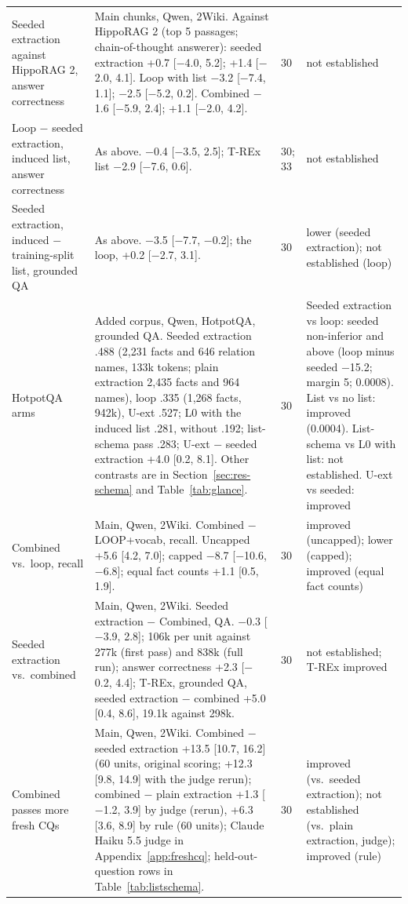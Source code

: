 \begin{table}[!t]
\begin{tabular}{P{3.5cm}P{9.4cm}P{0.8cm}P{3.9cm}}
Seeded extraction against HippoRAG 2, answer correctness & Main chunks, Qwen, 2Wiki. Against HippoRAG 2 (top 5 passages; chain-of-thought answerer): seeded extraction +0.7 [$-$4.0, 5.2]; +1.4 [$-$2.0, 4.1]. Loop with list $-$3.2 [$-$7.4, 1.1]; $-$2.5 [$-$5.2, 0.2]. Combined $-$1.6 [$-$5.9, 2.4]; +1.1 [$-$2.0, 4.2]. & 30 & not established \\
Loop $-$ seeded extraction, induced list, answer correctness & As above. $-$0.4 [$-$3.5, 2.5]; T-REx list $-$2.9 [$-$7.6, 0.6]. & 30; 33 & not established \\
Seeded extraction, induced $-$ training-split list, grounded QA & As above. $-$3.5 [$-$7.7, $-$0.2]; the loop, +0.2 [$-$2.7, 3.1]. & 30 & lower (seeded extraction); not established (loop) \\
HotpotQA arms & Added corpus, Qwen, HotpotQA, grounded QA. Seeded extraction .488 (2,231 facts and 646 relation names, 133k tokens; plain extraction 2,435 facts and 964 names), loop .335 (1,268 facts, 942k), U-ext .527; L0 with the induced list .281, without .192; list-schema pass .283; U-ext $-$ seeded extraction +4.0 [0.2, 8.1]. Other contrasts are in Section~\ref{sec:res-schema} and Table~\ref{tab:glance}. & 30 & Seeded extraction vs loop: seeded non-inferior and above (loop minus seeded $-$15.2; margin 5; 0.0008). List vs no list: improved (0.0004). List-schema vs L0 with list: not established. U-ext vs seeded: improved \\
Combined vs.\ loop, recall & Main, Qwen, 2Wiki. Combined $-$ LOOP+vocab, recall. Uncapped +5.6 [4.2, 7.0]; capped $-$8.7 [$-$10.6, $-$6.8]; equal fact counts +1.1 [0.5, 1.9]. & 30 & improved (uncapped); lower (capped); improved (equal fact counts) \\
Seeded extraction vs.\ combined & Main, Qwen, 2Wiki. Seeded extraction $-$ Combined, QA. $-$0.3 [$-$3.9, 2.8]; 106k per unit against 277k (first pass) and 838k (full run); answer correctness +2.3 [$-$0.2, 4.4]; T-REx, grounded QA, seeded extraction $-$ combined +5.0 [0.4, 8.6], 19.1k against 298k. & 30 & not established; T-REx improved \\
Combined passes more fresh CQs & Main, Qwen, 2Wiki. Combined $-$ seeded extraction +13.5 [10.7, 16.2] (60 units, original scoring; +12.3 [9.8, 14.9] with the judge rerun); combined $-$ plain extraction +1.3 [$-$1.2, 3.9] by judge (rerun), +6.3 [3.6, 8.9] by rule (60 units); Claude Haiku 5.5 judge in Appendix~\ref{app:freshcq}; held-out-question rows in Table~\ref{tab:listschema}. & 30 & improved (vs.\ seeded extraction); not established (vs.\ plain extraction, judge); improved (rule) \\
\bottomrule
\end{tabular}
\end{table}

